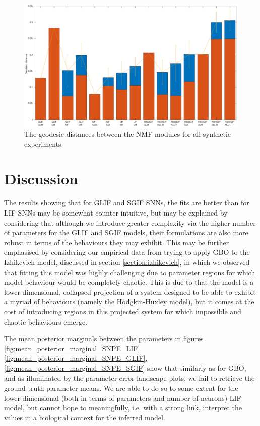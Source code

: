 \documentclass[mphil,deptreport,ianc]{infthesis} %
\begin{document}
\begin{figure}
    \hspace{-0.1\columnwidth}
    \includegraphics[width=1.2\columnwidth]{figures/matlab/NMF_geodesic_all_Synthetic_v2.eps}
    \caption{The geodesic distances between the NMF modules for all synthetic experiments.}
    \label{fig:geodesic_all}
\end{figure}


\section{Discussion}

The results showing that for GLIF and SGIF SNNs, the fits are better than for LIF SNNs may be somewhat counter-intuitive, but may be explained by considering that although we introduce greater complexity via the higher number of parameters for the GLIF and SGIF models, their formulations are also more robust in terms of the behaviours they may exhibit.
This may be further emphasised by considering our empirical data from trying to apply GBO to the Izhikevich model, discussed in section \ref{section:izhikevich}, in which we observed that fitting this model was highly challenging due to parameter regions for which model behaviour would be completely chaotic.
This is due to that the model is a lower-dimensional, collapsed projection of a system designed to be able to exhibit a myriad of behaviours (namely the Hodgkin-Huxley \cite{HH1952} model), but it comes at the cost of introducing regions in this projected system for which impossible and chaotic behaviours emerge.

The mean posterior marginals between the parameters in figures \ref{fig:mean_posterior_marginal_SNPE_LIF}, \ref{fig:mean_posterior_marginal_SNPE_GLIF}, \ref{fig:mean_posterior_marginal_SNPE_SGIF} show that similarly as for GBO, and as illuminated by the parameter error landscape plots, we fail to retrieve the ground-truth parameter means.
We are able to do so to some extent for the lower-dimensional (both in terms of parameters and number of neurons) LIF model, but cannot hope to meaningfully, i.e. with a strong link, interpret the values in a biological context for the inferred model.
\end{document}
